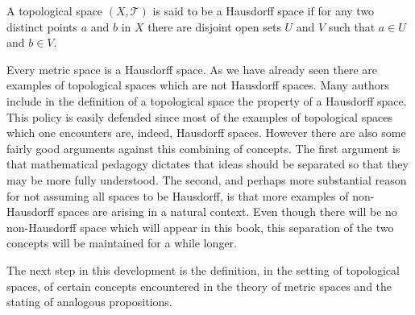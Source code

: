 A topological space $(X, \mathcal{T})$ is said to be a Hausdorff space if for any two distinct points $a$ and $b$ in $X$ there are disjoint open sets $U$ and $V$ such that $a \in U$ and $b \in V$.

Every metric space is a Hausdorff space. As we have already seen there are examples of topological spaces which are not Hausdorff spaces. Many authors include in the definition of a topological space the property of a Hausdorff space. This policy is easily defended since most of the examples of topological spaces which one encounters are, indeed, Hausdorff spaces. However there are also some fairly good arguments against this combining of concepts. The first argument is that mathematical pedagogy dictates that ideas should be separated so that they may be more fully understood. The second, and perhaps more substantial reason for not assuming all spaces to be Hausdorff, is that more examples of non-Hausdorff spaces are arising in a natural context. Even though there will be no non-Hausdorff space which will appear in this book, this separation of the two concepts will be maintained for a while longer.

The next step in this development is the definition, in the setting of topological spaces, of certain concepts encountered in the theory of metric spaces and the stating of analogous propositions.